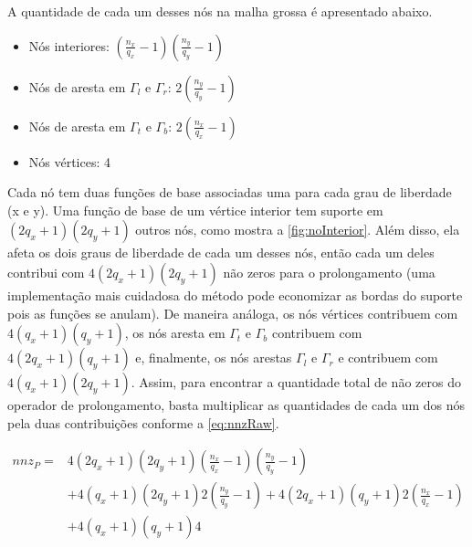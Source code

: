 A quantidade de cada um desses nós na malha grossa é apresentado abaixo.

\begin{itemize}
    \item Nós interiores: $(\frac{n_x}{q_x} - 1) (\frac{n_y}{q_y} - 1)$
    \item Nós de aresta em $\Gamma_l$ e $\Gamma_r$: $2 ( \frac{n_y}{q_y} - 1)$
    \item Nós de aresta em $\Gamma_t$ e $\Gamma_b$: $2 ( \frac{n_x}{q_x} - 1)$
    \item Nós vértices: 4 
\end{itemize}


Cada nó tem duas funções de base associadas uma para cada grau de liberdade (x e y). Uma função de base de um vértice interior tem suporte  em $(2q_x+1)(2q_y+1)$ outros nós, como mostra a \ref{fig:noInterior}. Além disso, ela afeta os dois graus de liberdade de cada um desses nós, então cada um deles contribui com $4(2q_x+1)(2q_y+1)$  não zeros para o prolongamento (uma implementação mais cuidadosa do método pode economizar as bordas do suporte pois as funções se anulam). De maneira análoga, os nós vértices contribuem com $ 4 (q_x+1)(q_y+1)$, os nós aresta em $\Gamma_t$ e $\Gamma_b$ contribuem com $ 4 (2q_x+1)(q_y+1) $ e, finalmente, os nós arestas  $\Gamma_l$ e $\Gamma_r$ e contribuem com $ 4(q_x+1)(2q_y+1) $. Assim, para encontrar a quantidade total de não zeros do operador de prolongamento, basta multiplicar as quantidades de cada um dos nós pela duas contribuições conforme a   \eqref{eq:nnzRaw}. 


\begin{equation} \label{eq:nnzRaw}
\begin{aligned}
    nnz_P = & 4(2q_x+1)(2q_y+1)  (\frac{n_x}{q_x} - 1) (\frac{n_y}{q_y} - 1)   \\ 
            & + 4 (q_x+1)(2q_y+1)  2 ( \frac{n_y}{q_y} - 1) +  4 (2q_x+1)(q_y+1)  2 (\frac{n_x}{q_x} - 1) \\
            & +  4(q_x+1)(q_y+1) 4 
\end{aligned}
\end{equation}

